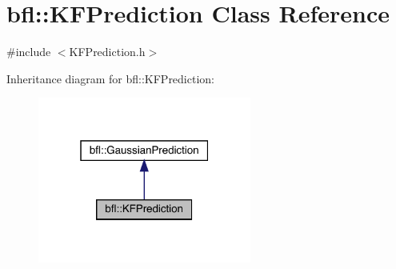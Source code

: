 \hypertarget{classbfl_1_1KFPrediction}{}\section{bfl\+:\+:K\+F\+Prediction Class Reference}
\label{classbfl_1_1KFPrediction}


{\ttfamily \#include $<$K\+F\+Prediction.\+h$>$}



Inheritance diagram for bfl\+:\+:K\+F\+Prediction\+:
\nopagebreak
\begin{figure}[H]
\begin{center}
\leavevmode
\includegraphics[width=199pt]{classbfl_1_1KFPrediction__inherit__graph}
\end{center}
\end{figure}
